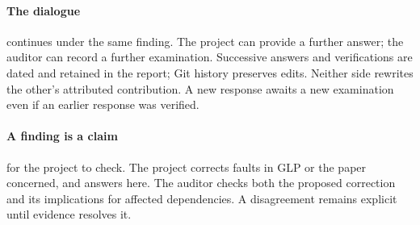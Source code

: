 \paragraph{The dialogue} continues under the same finding. The project can provide a further answer; the auditor can record a further examination. Successive answers and verifications are dated and retained in the report; Git history preserves edits. Neither side rewrites the other's attributed contribution. A new response awaits a new examination even if an earlier response was verified.

\paragraph{A finding is a claim} for the project to check. The project corrects faults in GLP or the paper concerned, and answers here. The auditor checks both the proposed correction and its implications for affected dependencies. A disagreement remains explicit until evidence resolves it.

